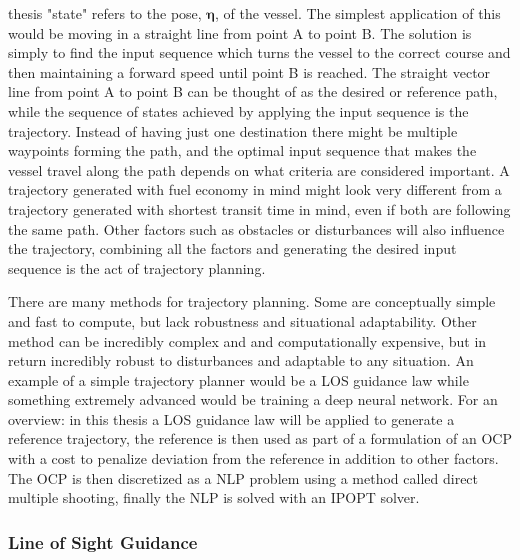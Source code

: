 thesis "state" refers to the pose, $\bm{\eta}$, of the vessel. The simplest application of this would be moving in a straight line from point A to point B.
The solution is simply to find the input sequence which turns the vessel to the correct course and then maintaining a forward speed until point B is reached.
The straight vector line from point A to point B can be thought of as the desired or reference path, while the sequence of states achieved by applying the 
input sequence is the trajectory. Instead of having just one destination there might be multiple waypoints forming the path, and the optimal
input sequence that makes the vessel travel along the path depends on what criteria are considered important. A trajectory generated with fuel
economy in mind might look very different from a trajectory generated with shortest transit time in mind, even if both are following the same path.
Other factors such as obstacles or disturbances will also influence the trajectory, combining all the factors and generating the desired
input sequence is the act of trajectory planning.

There are many methods for trajectory planning. Some are conceptually simple and fast to compute, but lack robustness and situational adaptability.
Other method can be incredibly complex and and computationally expensive, but in return incredibly robust to disturbances and adaptable to
any situation. An example of a simple trajectory planner would be a \gls{LOS} guidance law while something extremely advanced would be training a deep
neural network. For an overview: in this thesis a \gls{LOS} guidance law will be applied to generate a reference trajectory, the reference is then used as part of a
formulation of an \gls{OCP} with a cost to penalize deviation from the reference in addition to other factors. The \gls{OCP} is then discretized
as a \gls{NLP} problem using a method called direct multiple shooting, finally the \gls{NLP} is solved with an \gls{IPOPT} solver.

\subsubsection*{Line of Sight Guidance} %

